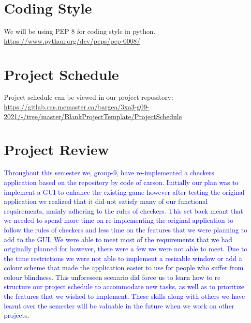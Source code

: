 \documentclass{article}
\begin{document}
\section{Coding Style}
We will be using PEP 8 for coding style in python. \\ \url{https://www.python.org/dev/peps/pep-0008/}

\section{Project Schedule}

Project schedule can be viewed in our project repository:\\
\url{https://gitlab.cas.mcmaster.ca/bargea/3xa3-g09-2021/-/tree/master/BlankProjectTemplate/ProjectSchedule}

\section{Project Review}
\textcolor{blue}{Throughout this semester we, group-9, have re-implemented a checkers application based on the repository by code of carson. Initially our plan was to implement a GUI to enhance the existing game however after testing the original application we realized that it did not satisfy many of our functional requirements, mainly adhering to the rules of checkers. This set back meant that we needed to spend more time on re-implementing the original application to follow the rules of checkers and less time on the features that we were planning to add to the GUI. We were able to meet most of the requirements that we had originally planned for however, there were a few we were not able to meet. Due to the time restrictions we were not able to implement a resizable window or add a colour scheme that made the application easier to use for people who suffer from colour blindness. This unforeseen scenario did force us to learn how to re structure our project schedule to accommodate new tasks, as well as to prioritize the features that we wished to implement. These skills along with others we have learnt over the semester will be valuable in the future when we work on other projects.}

\end{document}
